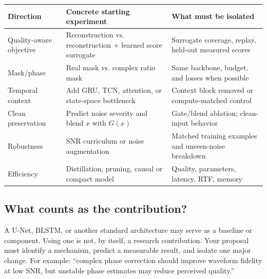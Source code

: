 \documentclass[11pt,letterpaper]{article}
\begin{document}
\begin{center}\small
\renewcommand{\arraystretch}{1.12}
\begin{tabularx}{\linewidth}{@{}>{\raggedright\arraybackslash}p{1.22in}YY@{}}
\toprule
Direction & Concrete starting experiment & What must be isolated\\\midrule
Quality-aware objective & Reconstruction vs. reconstruction + learned score surrogate & Surrogate coverage, replay, held-out measured scores\\
Mask/phase & Real mask vs. complex ratio mask & Same backbone, budget, and losses when possible\\
Temporal context & Add GRU, TCN, attention, or state-space bottleneck & Context block removed or compute-matched control\\
Clean preservation & Predict noise severity and blend $x$ with $G(x)$ & Gate/blend ablation; clean-input behavior\\
Robustness & SNR curriculum or noise augmentation & Matched training examples and unseen-noise breakdown\\
Efficiency & Distillation, pruning, causal or compact model & Quality, parameters, latency, RTF, memory\\
\bottomrule
\end{tabularx}
\end{center}

\subsection{What counts as the contribution?}
A U-Net, BLSTM, or another standard architecture may serve as a baseline or component. Using one is not, by itself, a research contribution. Your proposal must identify a mechanism, predict a measurable result, and isolate one major change. For example: ``complex phase correction should improve waveform fidelity at low SNR, but unstable phase estimates may reduce perceived quality.''
\end{document}
